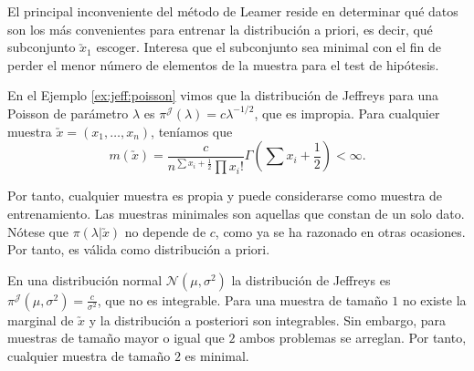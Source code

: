     El principal inconveniente del método de Leamer reside en determinar qué datos son los más convenientes para entrenar la distribución a priori, es decir, qué subconjunto $\utilde{x}_1$ escoger. Interesa que el subconjunto sea minimal con el fin de perder el menor número de elementos de la muestra para el test de hipótesis.

	\begin{ex}
		En el Ejemplo \ref{ex:jeff:poisson} vimos que la distribución de Jeffreys para una Poisson de parámetro $\lambda$ es $\pi^{\mathcal{J}}(\lambda)=c\lambda^{-1/2}$, que es impropia. Para cualquier muestra $\utilde{x}=(x_1,\ldots,x_n)$, teníamos que \[m(\utilde{x}) = \frac{c}{n ^{\sum{x_i} + \frac{1}{2}}\prod{x_i!}}\Gamma(\sum{x_i} + \frac{1}{2}) < \infty.\]

        Por tanto, cualquier muestra es propia y puede considerarse como muestra de entrenamiento. Las muestras minimales son aquellas que constan de un solo dato. Nótese que $\pi(\lambda | \utilde{x})$ no depende de $c$, como ya se ha razonado en otras ocasiones. Por tanto, es válida como distribución a priori.
	\end{ex}

	\begin{ex}
		En una distribución normal $\mathcal{N}(\mu,\sigma^2)$ la distribución de Jeffreys es $\pi^{\mathcal{J}}(\mu,\sigma^2) = \frac{c}{\sigma^2}$, que no es integrable. Para una muestra de tamaño $1$ no existe la marginal de $\utilde{x}$ y la distribución a posteriori son integrables. Sin embargo, para muestras de tamaño mayor o igual que $2$ ambos problemas se arreglan. Por tanto, cualquier muestra de tamaño $2$ es minimal.
	\end{ex}
